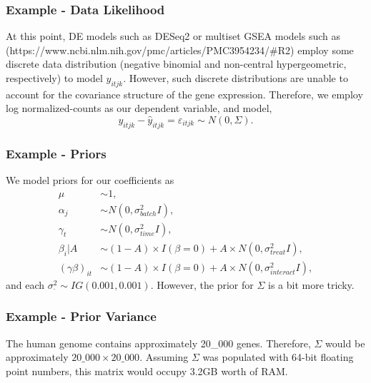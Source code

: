 \documentclass{beamer}
\begin{document}
\begin{frame}
  \frametitle{Example - Data Likelihood}
  At this point, DE models such as DESeq2 or multiset GSEA models such as (https://www.ncbi.nlm.nih.gov/pmc/articles/PMC3954234/#R2) employ some discrete data distribution (negative binomial and non-central hypergeometric, respectively) to model $y_{itjk}$.
  \vfill
  However, such discrete distributions are unable to account for the covariance structure of the gene expression. 
  Therefore, we employ log normalized-counts as our dependent variable, and model,
  \[
    y_{itjk} - \hat y_{itjk} = \varepsilon_{itjk} \sim N(0, \Sigma).
  \]
\end{frame}

\begin{frame}
  \frametitle{Example - Priors}
  We model priors for our coefficients as 
  \begin{align*}
    \mu &\sim 1,\\
    \alpha_j &\sim N(0, \sigma_{batch}^2I),\\ 
    \gamma_t &\sim N(0, \sigma_{time}^2I),\\ 
    \beta_i | A &\sim (1 - A)\times I(\beta = 0) + A \times N(0, \sigma_{treat}^2I), \\ 
    (\gamma\beta)_{it} &\sim (1 - A) \times I(\beta = 0) + A \times N(0, \sigma_{interact}^2I),
  \end{align*}
  and each $\sigma_\cdot^2\sim IG(0.001, 0.001)$.
  \vfill
  However, the prior for $\Sigma$ is a bit more tricky. 
\end{frame}

\begin{frame}
  \frametitle{Example - Prior Variance}
  The human genome contains approximately 20\_000 genes. 
  Therefore, $\Sigma$ would be approximately $20\_000\times 20\_000$. 
  Assuming $\Sigma$ was populated with 64-bit floating point numbers, this matrix would occupy 3.2GB worth of RAM. 

\end{frame}
\end{document}
